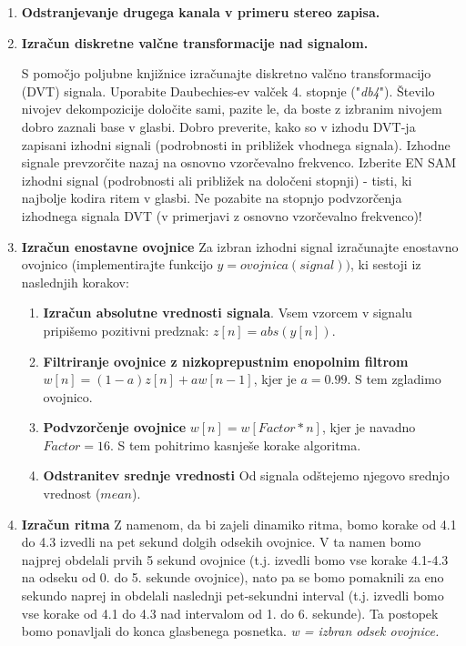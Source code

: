 \documentclass[a4paper,11pt]{article}
\begin{document}
\begin{enumerate}
\item \textbf{Odstranjevanje drugega kanala v primeru stereo zapisa.}

\item \textbf{Izračun diskretne valčne transformacije nad signalom.}

S pomočjo poljubne knjižnice izračunajte diskretno valčno transformacijo (DVT) signala. Uporabite Daubechies-ev valček 4. stopnje ("\textit{db4}"). Število nivojev dekompozicije določite sami, pazite le, da boste z izbranim nivojem dobro zaznali base v glasbi. Dobro preverite, kako so v izhodu DVT-ja zapisani izhodni signali (podrobnosti in približek vhodnega signala). Izhodne signale prevzorčite nazaj  na osnovno vzorčevalno frekvenco.
Izberite EN SAM izhodni signal (podrobnosti ali približek na določeni stopnji) - tisti, ki najbolje kodira ritem v glasbi. Ne pozabite na stopnjo podvzorčenja  izhodnega signala DVT (v primerjavi z osnovno vzorčevalno frekvenco)! 

\item \textbf{Izračun enostavne ovojnice}
Za izbran izhodni signal izračunajte enostavno ovojnico (implementirajte funkcijo $y=ovojnica(signal))$, ki sestoji iz naslednjih korakov:

	\begin{enumerate}[label*=\arabic*.]
	\item \textbf{Izračun absolutne vrednosti signala}. 
	Vsem vzorcem v signalu pripišemo pozitivni predznak: $z[n] = abs(y[n])$. 
	
	\item \textbf{Filtriranje ovojnice z nizkoprepustnim enopolnim filtrom}
	$w[n] = (1-a)z[n] + aw[n-1]$, kjer je $a=0.99$. S tem zgladimo ovojnico.
	
	\item \textbf{Podvzorčenje ovojnice}
	$w[n] = w[Factor*n]$, kjer je navadno $Factor=16$. S tem pohitrimo kasnješe korake algoritma.
	
	\item \textbf{Odstranitev srednje vrednosti}
	Od signala odštejemo njegovo srednjo vrednost ($mean$).

	\end{enumerate}

\item \textbf{Izračun ritma}
Z namenom, da bi zajeli dinamiko ritma, bomo korake od 4.1 do 4.3 izvedli na pet sekund dolgih odsekih ovojnice. V ta namen bomo najprej obdelali prvih 5 sekund ovojnice (t.j. izvedli bomo vse korake 4.1-4.3 na odseku od 0. do 5. sekunde ovojnice), nato pa se bomo  pomaknili za eno sekundo naprej in obdelali naslednji pet-sekundni interval (t.j. izvedli bomo vse korake od 4.1 do 4.3 nad intervalom od 1. do 6. sekunde). Ta postopek bomo ponavljali do konca glasbenega posnetka. \textit{w = izbran odsek ovojnice.}
	

\end{enumerate}
\end{document}
